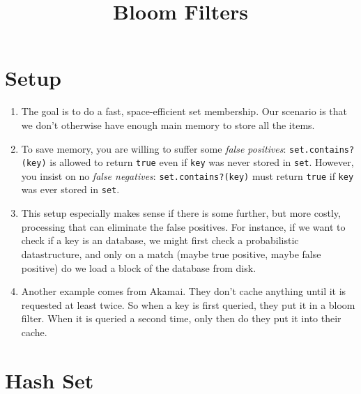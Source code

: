 \documentclass[11pt, oneside]{amsart}
\begin{document}
\title{Bloom Filters}
\maketitle

\newcommand{\bigO}[0]{\mathcal{O}}

\section{Setup}

\begin{enumerate}

\item The goal is to do a fast, space-efficient set membership. Our
scenario is that we don't otherwise have enough main memory to store all
the items.

\item To save memory, you are willing to suffer some \emph{false
positives}: \texttt{set.contains?(key)} is allowed to return
\texttt{true} even if \texttt{key} was never stored in \texttt{set}.
However, you insist on no \emph{false negatives}:
\texttt{set.contains?(key)} must return \texttt{true} if \texttt{key}
was ever stored in \texttt{set}.

\item This setup especially makes sense if there is some further, but
more costly, processing that can eliminate the false positives. For
instance, if we want to check if a key is an database, we might first
check a probabilistic datastructure, and only on a match (maybe true
positive, maybe false positive) do we load a block of the database from
disk.

\item Another example comes from Akamai. They don't cache anything until
it is requested at least twice. So when a key is first queried, they put
it in a bloom filter. When it is queried a second time, only then do
they put it into their cache.

\end{enumerate}

\section{Hash Set}
\end{document}
